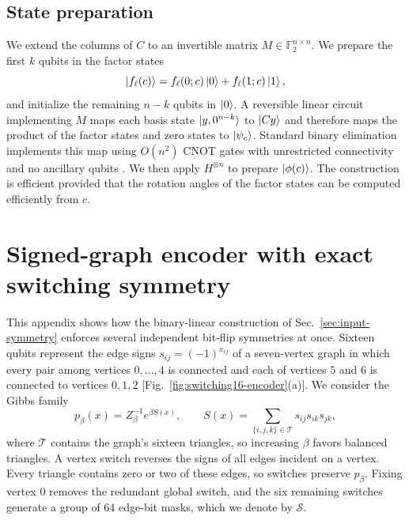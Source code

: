 \documentclass[pra,aps,10pt,twocolumn,floatfix,superscriptaddress, notitlepage,longbibliography]{revtex4-2}
\begin{document}
\subsection{State preparation}

We extend the columns of $C$ to an invertible matrix $M\in\mathbb F_2^{n\times n}$. We prepare the first $k$ qubits in the factor states
\begin{equation}
 \ket{f_\ell(c)}
 =f_\ell(0;c)\ket0+f_\ell(1;c)\ket1,
\end{equation}
and initialize the remaining $n-k$ qubits in $\ket0$. A reversible linear circuit implementing $M$ maps each basis state $\ket{y,0^{n-k}}$ to $\ket{Cy}$ and therefore maps the product of the factor states and zero states to $\ket{\psi_c}$. Standard binary elimination implements this map using $O(n^2)$ CNOT gates with unrestricted connectivity and no ancillary qubits \cite{patelOptimalSynthesisLinear2008}. We then apply $H^{\otimes n}$ to prepare $\ket{\phi(c)}$. The construction is efficient provided that the rotation angles of the factor states can be computed efficiently from $c$.

\section{Signed-graph encoder with exact switching symmetry}
\label{app:switching16}

This appendix shows how the binary-linear construction of Sec.~\ref{sec:input-symmetry} enforces several independent bit-flip symmetries at once. Sixteen qubits represent the edge signs $s_{ij}=(-1)^{x_{ij}}$ of a seven-vertex graph in which every pair among vertices $0,\ldots,4$ is connected and each of vertices $5$ and $6$ is connected to vertices $0,1,2$ [Fig.~\ref{fig:switching16-encoder}(a)]. We consider the Gibbs family
\begin{equation}
 p_\beta(x)=Z_\beta^{-1}e^{\beta S(x)},\qquad
 S(x)=\sum_{\{i,j,k\}\in\mathcal T}s_{ij}s_{ik}s_{jk},
\end{equation}
where $\mathcal T$ contains the graph's sixteen triangles, so increasing $\beta$ favors balanced triangles. A vertex switch reverses the signs of all edges incident on a vertex. Every triangle contains zero or two of these edges, so switches preserve $p_\beta$. Fixing vertex $0$ removes the redundant global switch, and the six remaining switches generate a group of $64$ edge-bit masks, which we denote by $\mathcal S$.
\end{document}
